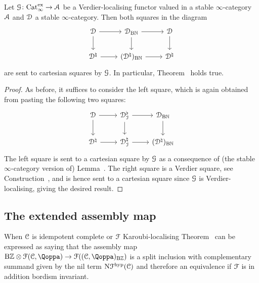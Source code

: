 \begin{corollary}
\label{corollary:nil-is-invariant}%
Let $\mathcal{G}\colon \mathrm{Cat}_\infty^{\mathrm{ex}} \to \mathcal{A}$ be a Verdier-localising functor valued in a stable $\infty$-category $\mathcal{A}$ and $\mathcal{D}$ a stable $\infty$-category. Then both squares in the diagram
\[
\begin{tikzcd}
	\D \ar[r]\ar[d] & \D_{\B\NN} \ar[r] \ar[d] & \D \ar[d] \\
	\D^\natural \ar[r] & (\D^{\natural})_{\B\NN} \ar[r] & \D^\natural
\end{tikzcd}
\]
are sent to cartesian squares by $\mathcal{G}$. In particular, Theorem~\; holds true.
\end{corollary}
\begin{proof}
As before, it suffices to consider the left square, which is again obtained from pasting the following two squares:
\[
\begin{tikzcd}
	\D \ar[r] \ar[d] & \D^\flat_\I \ar[r] \ar[d] & \D_{\B\NN} \ar[d] \\
	\D^\natural \ar[r] & \D^\natural_\I \ar[r] & (\D^\natural)_{\B\NN}
\end{tikzcd}
\]
The left square is sent to a cartesian square by $\mathcal{G}$ as a consequence of (the stable $\infty$-category version of) Lemma~. The right square is a Verdier square, see Construction~, and is hence sent to a cartesian square since $\mathcal{G}$ is Verdier-localising, giving the desired result.
\end{proof}















\subsection{The extended assembly map}
\label{subsection:extended}%

When $\mathcal C$ is idempotent complete or $\mathcal{F}$ Karoubi-localising Theorem~ can be expressed as saying that the assembly map $\B\ZZ \otimes \F(\C,\QF) \to \F((\C,\QF)_{\B\ZZ})$ is a split inclusion with complementary summand given by the nil term $\mathrm{N}\mathcal{F}^{\mathrm{hyp}}(\mathcal C)$ and therefore an equivalence if $\mathcal{F}$ is in addition bordism invariant. 

